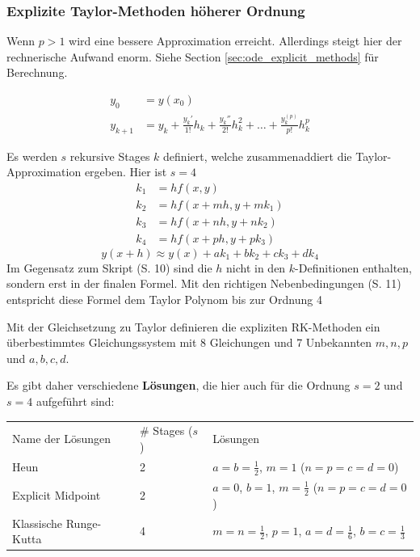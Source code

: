    \subsubsection{Explizite Taylor-Methoden höherer Ordnung}
      Wenn $p > 1$ wird eine bessere Approximation erreicht. Allerdings steigt hier der rechnerische
      Aufwand enorm. Siehe Section \ref{sec:ode_explicit_methods} für Berechnung.

      \begin{align*}
          y_0 &= y(x_0) \\
          y_{k+1} &= y_k + \frac{y_k'}{1!}h_k + \frac{y_k''}{2!} h_k^2 + \ldots + \frac{y_k^{(p)}}{p!} h_k^p
      \end{align*}

\newpage
      Es werden $s$ rekursive Stages $k$ definiert, welche zusammenaddiert die Taylor-Approximation ergeben.
      Hier ist $s=4$
      \begin{align*}
        k_1 &= hf(x,y)\\
        k_2 &= hf(x + m h, y+m k_1)\\
        k_3 &= hf(x + n h, y+n  k_2)\\
        k_4 &= hf(x + p h, y+p k_3)
      \end{align*}
      $$y(x+h) \approx y(x) + a k_1 + b k_2 + c k_3 + d k_4 $$
      Im Gegensatz zum Skript (S. 10) sind die
      $h$ nicht in den $k$-Definitionen enthalten, sondern erst in der finalen Formel. Mit den richtigen Nebenbedingungen (S. 11)
      entspricht diese Formel dem Taylor Polynom bis zur Ordnung 4

      Mit der Gleichsetzung zu Taylor definieren die expliziten RK-Methoden ein
      überbestimmtes Gleichungssystem mit 8 Gleichungen und 7 Unbekannten $m,n,p$ und $a,b,c,d$.

      Es gibt daher verschiedene \textbf{Lösungen}, die hier auch für die Ordnung $s=2$ und $s=4$ aufgeführt sind:\\
      \begin{tabular}{lll}
        Name der Lösungen & \# Stages ($s$) & Lösungen\\
        Heun & 2 & $a=b=\frac12$, $m=1$ ($n=p=c=d=0$)\\
        Explicit Midpoint & 2 & $a=0$, $b=1$, $m=\frac12$ ($n=p=c=d=0$)\\
        Klassische Runge-Kutta & 4 & $m=n=\frac12$, $p=1$, $a=d=\frac16$, $b=c=\frac13$
      \end{tabular}



